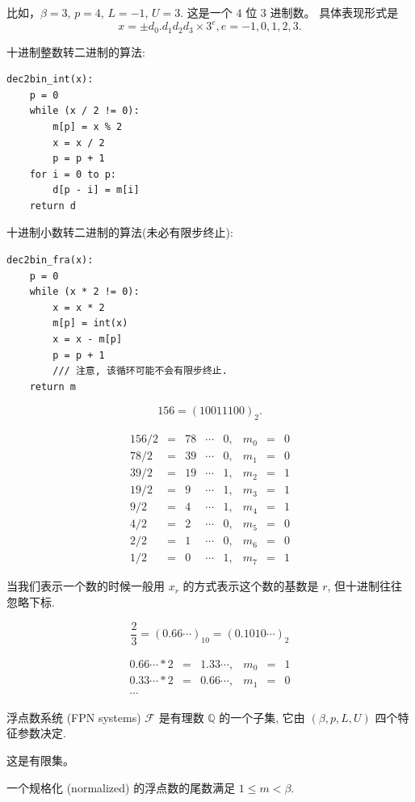 \documentclass[a4paper]{ctexart}
\begin{document}
{比如，$\beta = 3$, $p = 4$, $L = -1$, $U = 3$. 这是一个 $4$ 位 $3$ 进制数。
具体表现形式是
$$
x = \pm d_0.d_1d_2d_3 \times 3^e, e = -1, 0, 1, 2, 3.
$$


 十进制整数转二进制的算法:
\begin{verbatim}
dec2bin_int(x):
    p = 0
    while (x / 2 != 0):
        m[p] = x % 2
        x = x / 2
        p = p + 1
    for i = 0 to p:
        d[p - i] = m[i]
    return d
\end{verbatim}
十进制小数转二进制的算法(未必有限步终止):
\begin{verbatim}
dec2bin_fra(x):
    p = 0
    while (x * 2 != 0):
        x = x * 2
        m[p] = int(x)
        x = x - m[p]
        p = p + 1
        /// 注意, 该循环可能不会有限步终止.
    return m
\end{verbatim}

$$
156 = (10011100)_2.
$$

$$
\begin{array}{rclclrcl}
  156 / 2 &=& 78 &\cdots& 0,& m_0 &=& 0 \\
  78 / 2 &=& 39 &\cdots& 0,& m_1 &=& 0 \\
  39 / 2 &=& 19 &\cdots& 1,& m_2 &=& 1\\
  19 / 2 &=& 9 &\cdots& 1,& m_3 &=& 1\\
  9 / 2 &=& 4 &\cdots& 1,& m_4 &=& 1\\
  4 / 2 &=& 2 &\cdots& 0,& m_5 &=& 0\\
  2 / 2 &=& 1 &\cdots& 0,& m_6 &=& 0\\
  1 / 2 &=& 0 &\cdots& 1,& m_7 &=& 1
\end{array}
$$

当我们表示一个数的时候一般用 $x_r$ 的方式表示这个数的基数是 $r$,
但十进制往往忽略下标.

$$
\frac{2}{3} = (0.66\cdots)_{10} = (0.1010\cdots)_2
$$

$$
\begin{array}{rclrcl}
  0.66\cdots * 2 &=& 1.33\cdots, & m_0 &=& 1 \\
  0.33\cdots * 2 &=& 0.66\cdots, & m_1 &=& 0 \\
  \cdots&&&&&
\end{array}
$$

 浮点数系统 (FPN systems) $\mathscr{F}$ 是有理数
$\mathbb{Q}$ 的一个子集, 它由 $(\beta, p, L, U)$ 四个特征参数决定.

这是有限集。

 一个规格化 (normalized) 的浮点数的尾数满足
$1 \leq m < \beta$.

}
\end{document}
